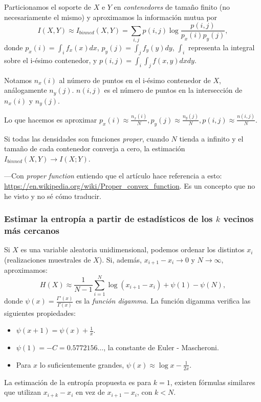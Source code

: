 \documentclass[10pt,a4paper]{article} %
\theoremstyle{definition}
\begin{document}
Particionamos el soporte de $X$ e $Y$ en \textit{contenedores} de tamaño finito (no necesariamente el mismo) y aproximamos la información mutua por \[
I(X,Y) \approx I_{\textit{binned}}(X,Y) = \sum_{i,j} p(i,j) \log \frac{p(i,j)}{p_x(i)p_y(j)},
\]
donde $p_x(i) = \int_i f_x(x)dx$, $p_y(j) = \int_j f_y(y)dy$, $\int_i$ representa la integral sobre el i-ésimo contenedor, y $p(i,j) = \int_i\int_jf(x,y)dxdy$.

Notamos $n_x(i)$ al número de puntos en el i-ésimo contenedor de $X$, análogamente $n_y(j)$. $n(i,j)$ es el número de puntos en la intersección de $n_x(i)$ y $n_y(j)$.

Lo que hacemos es aproximar $p_x(i) \approx \frac{n_x(i)}{N}, p_y(j) \approx \frac{n_y(j)}{N}, p(i,j) \approx \frac{n(i,j)}{N}$.

Si todas las densidades son funciones \textit{proper}, cuando $N$ tienda a infinito y el tamaño de cada contenedor converja a cero, la estimación $I_{\textit{binned}}(X,Y) \to I(X;Y)$.

---Con \textit{proper function} entiendo que el artículo hace referencia a esto: \url{https://en.wikipedia.org/wiki/Proper\_convex\_function}. Es un concepto que no he visto y no sé cómo traducir.

\subsubsection{Estimar la entropía a partir de estadísticos de los $k$ vecinos más cercanos}

Si $X$ es una variable aleatoria unidimensional, podemos ordenar los distintos $x_i$ (realizaciones muestrales de $X$). Si, además, $x_{i+1} -x_i \to 0$ y $N\to \infty$, aproximamos:\[
H(X)\approx \frac{1}{N-1}\sum_{i=1}^N \log(x_{i+1}-x_i) + \psi(1) - \psi(N),\]
donde $\psi(x) = \frac{\Gamma'(x)}{\Gamma(x)}$ es la \textit{función digamma}. La función digamma verifica las siguientes propiedades:
\begin{itemize}
\item $\psi(x+1) = \psi(x) + \frac{1}{x}$.
\item $\psi(1) = -C = 0.5772156\dots$, la constante de Euler - Mascheroni.
  \item Para $x$ lo suficientemente grandes, $\psi(x) \approx \log x - \frac{1}{2x}$.
\end{itemize}

La estimación de la entropía propuesta es para $k=1$, existen fórmulas similares que utilizan $x_{i+k}-x_i$  en vez de $x_{i+1}-x_i$, con $k < N$.
\end{document}
